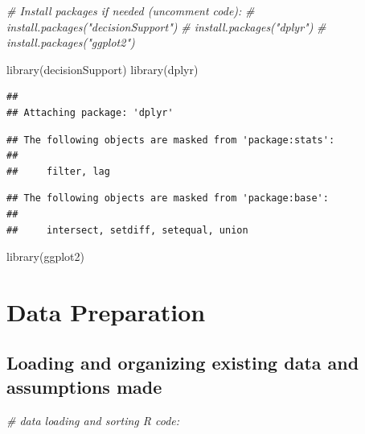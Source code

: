 \documentclass[
]{article}
\newenvironment{Shaded}{\begin{snugshade}}{\end{snugshade}}
\newcommand{\CommentTok}[1]{\textcolor[rgb]{0.56,0.35,0.01}{\textit{#1}}}
\newcommand{\FunctionTok}[1]{\textcolor[rgb]{0.00,0.00,0.00}{#1}}
\newcommand{\NormalTok}[1]{#1}
\begin{document}
\begin{Shaded}
\begin{Highlighting}[]
\CommentTok{\# Install packages if needed (uncomment code):}
\CommentTok{\# install.packages("decisionSupport")}
\CommentTok{\# install.packages("dplyr")}
\CommentTok{\# install.packages("ggplot2")}

\FunctionTok{library}\NormalTok{(decisionSupport)}
\FunctionTok{library}\NormalTok{(dplyr)}
\end{Highlighting}
\end{Shaded}

\begin{verbatim}
## 
## Attaching package: 'dplyr'
\end{verbatim}

\begin{verbatim}
## The following objects are masked from 'package:stats':
## 
##     filter, lag
\end{verbatim}

\begin{verbatim}
## The following objects are masked from 'package:base':
## 
##     intersect, setdiff, setequal, union
\end{verbatim}

\begin{Shaded}
\begin{Highlighting}[]
\FunctionTok{library}\NormalTok{(ggplot2)}
\end{Highlighting}
\end{Shaded}

\hypertarget{data-preparation}{%
\section{Data Preparation}\label{data-preparation}}

\hypertarget{loading-and-organizing-existing-data-and-assumptions-made}{%
\subsection{Loading and organizing existing data and assumptions
made}\label{loading-and-organizing-existing-data-and-assumptions-made}}

\begin{Shaded}
\begin{Highlighting}[]
\CommentTok{\# data loading and sorting R code:}
\end{Highlighting}
\end{Shaded}
\end{document}

